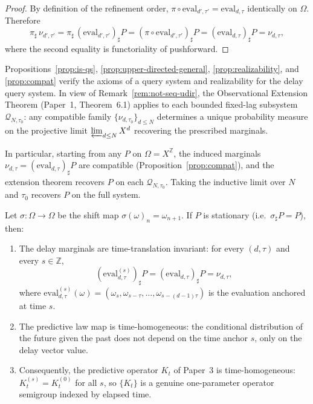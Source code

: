 \begin{proof}
By definition of the refinement order, $\pi \circ \mathrm{eval}_{d',\tau'}
= \mathrm{eval}_{d,\tau}$ identically on $\Omega$.  Therefore
\[
  \pi_\sharp\, \nu_{d',\tau'}
  = \pi_\sharp\, (\mathrm{eval}_{d',\tau'})_\sharp P
  = (\pi \circ \mathrm{eval}_{d',\tau'})_\sharp P
  = (\mathrm{eval}_{d,\tau})_\sharp P
  = \nu_{d,\tau},
\]
where the second equality is functoriality of pushforward.
\end{proof}

\begin{remark}\label{rem:ext-scope}
Propositions~\ref{prop:is-qs}, \ref{prop:upper-directed-general},
\ref{prop:realizability}, and \ref{prop:compat} verify the axioms of a
query system and realizability for the delay query system.  In view of
Remark~\ref{rem:not-seq-udir}, the Observational Extension Theorem
(Paper~1, Theorem~6.1) applies to each bounded fixed-lag subsystem
$\mathcal{Q}_{N,\tau_0}$: any compatible family $\{\nu_{d,\tau_0}\}_{d \leq N}$
determines a unique probability measure on the projective limit
$\varprojlim_{d \leq N} X^d$ recovering the prescribed marginals.

In particular, starting from any $P$ on $\Omega = X^{\mathbb{Z}}$, the
induced marginals $\nu_{d,\tau} = (\mathrm{eval}_{d,\tau})_\sharp P$ are
compatible (Proposition~\ref{prop:compat}), and the extension theorem
recovers $P$ on each $\mathcal{Q}_{N,\tau_0}$.  Taking the inductive limit
over $N$ and $\tau_0$ recovers $P$ on the full system.
\end{remark}

\begin{proposition}\label{prop:stationarity}
Let $\sigma : \Omega \to \Omega$ be the shift map $\sigma(\omega)_n = \omega_{n+1}$.
If $P$ is stationary (i.e.\ $\sigma_\sharp P = P$), then:
\begin{enumerate}
  \item The delay marginals are time-translation invariant: for every
    $(d,\tau)$ and every $s \in \mathbb{Z}$,
    \[
      (\mathrm{eval}_{d,\tau}^{(s)})_\sharp P = (\mathrm{eval}_{d,\tau})_\sharp P
      = \nu_{d,\tau},
    \]
    where $\mathrm{eval}_{d,\tau}^{(s)}(\omega)
    = (\omega_s, \omega_{s-\tau}, \ldots, \omega_{s-(d-1)\tau})$ is the
    evaluation anchored at time $s$.
  \item The predictive law map is time-homogeneous: the conditional
    distribution of the future given the past does not depend on the
    time anchor $s$, only on the delay vector value.
  \item Consequently, the predictive operator $K_t$ of Paper~3 is
    time-homogeneous: $K_t^{(s)} = K_t^{(0)}$ for all $s$, so $\{K_t\}$
    is a genuine one-parameter operator semigroup indexed by elapsed time.
\end{enumerate}
\end{proposition}

